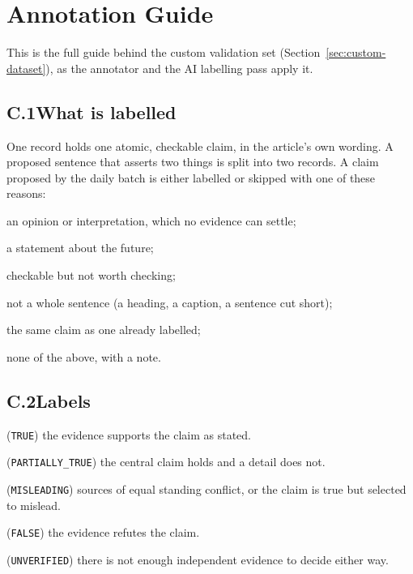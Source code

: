 
\chapter{Annotation Guide}
\label{app:annotation-guide}

This is the full guide behind the custom validation set
(Section~\ref{sec:custom-dataset}), as the annotator and the AI
labelling pass apply it.

\section*{C.1\quad What is labelled}

One record holds one atomic, checkable claim, in the article's own
wording. A proposed sentence that asserts two things is split into two
records. A claim proposed by the daily batch is either labelled or
skipped with one of these reasons:

\begin{description}[leftmargin=2.6cm,labelwidth=2.4cm]
    \item[opinion] an opinion or interpretation, which no evidence can
    settle;
    \item[prediction] a statement about the future;
    \item[trivial] checkable but not worth checking;
    \item[fragment] not a whole sentence (a heading, a caption, a
    sentence cut short);
    \item[duplicate] the same claim as one already labelled;
    \item[other] none of the above, with a note.
\end{description}

\section*{C.2\quad Labels}

\begin{description}[leftmargin=2.6cm,labelwidth=2.4cm]
    \item[supported] (\texttt{TRUE}) the evidence supports the claim as
    stated.
    \item[partially supported] (\texttt{PARTIALLY\_TRUE}) the central
    claim holds and a detail does not.
    \item[conflicting] (\texttt{MISLEADING}) sources of equal standing
    conflict, or the claim is true but selected to mislead.
    \item[refuted] (\texttt{FALSE}) the evidence refutes the claim.
    \item[not enough evidence] (\texttt{UNVERIFIED}) there is not
    enough independent evidence to decide either way.
\end{description}

